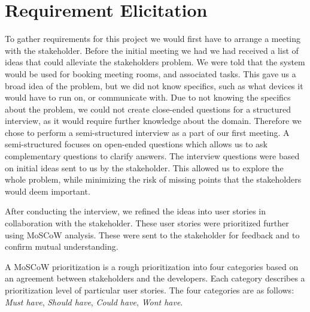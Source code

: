 \section{Requirement Elicitation}\label{sec:requirement_elicitation}
To gather requirements for this project we would first have to arrange a meeting with the stakeholder. 
Before the initial meeting we had we had received a list of ideas that could alleviate the stakeholders problem.
We were told that the system would be used for booking meeting rooms, and associated tasks. 
This gave us a broad idea of the problem, but we did not know specifics, such as what devices it would have to run on, or communicate with.
Due to not knowing the specifics about the problem, we could not create close-ended questions for a structured interview, as it would require further knowledge about the domain.
Therefore we chose to perform a semi-structured interview as a part of our first meeting.
A semi-structured focuses on open-ended questions which allows us to ask complementary questions to clarify answers. 
The interview questions were based on initial ideas sent to us by the stakeholder. 
This allowed us to explore the whole problem, while minimizing the risk of missing points that the stakeholders would deem important. \cite{InterviewsNHS}



After conducting the interview, we refined the ideas into user stories in collaboration with the stakeholder. These user stories were prioritized further using MoSCoW analysis\cite{DEBbook}.
These were sent to the stakeholder for feedback and to confirm mutual understanding.

A MoSCoW prioritization is a rough prioritization into four categories based on an agreement between stakeholders and the developers.
Each category describes a prioritization level of particular user stories. The four categories are as follows: \textit{Must have}, \textit{Should have}, \textit{Could have}, \textit{Wont have}.

